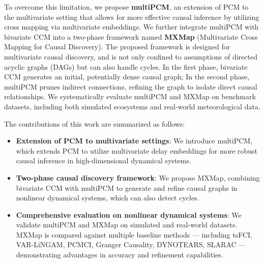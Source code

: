 To overcome this limitation, we propose \textbf{multiPCM}, an extension of PCM to the multivariate setting that allows for more effective causal inference by utilizing cross mapping via multivariate embeddings. We further integrate multiPCM with bivariate CCM into a two-phase framework named \textbf{MXMap} (Multivariate Cross Mapping for Causal Discovery). The proposed framework is designed for multivariate causal discovery, and is not only confined to assumptions of directed acyclic graphs (DAGs) but can also handle cycles. In the first phase, bivariate CCM generates an initial, potentially dense causal graph; In the second phase, multiPCM prunes indirect connections, refining the graph to isolate direct causal relationships. We systematically evaluate multiPCM and MXMap on benchmark datasets, including both simulated ecosystems and real-world meteorological data.

The contributions of this work are summarized as follows:

\begin{itemize}
    \item \textbf{Extension of PCM to multivariate settings}: We introduce multiPCM, which extends PCM to utilize multivariate delay embeddings for more robust causal inference in high-dimensional dynamical systems.
    \item \textbf{Two-phase causal discovery framework}: We propose MXMap, combining bivariate CCM with multiPCM to generate and refine causal graphs in nonlinear dynamical systems, which can also detect cycles.
    \item \textbf{Comprehensive evaluation on nonlinear dynamical systems}: We validate multiPCM and MXMap on simulated and real-world datasets. MXMap is compared against multiple baseline methods — including tsFCI, VAR-LiNGAM, PCMCI, Granger Causality, DYNOTEARS, SLARAC — demonstrating advantages in accuracy and refinement capabilities.
\end{itemize}
